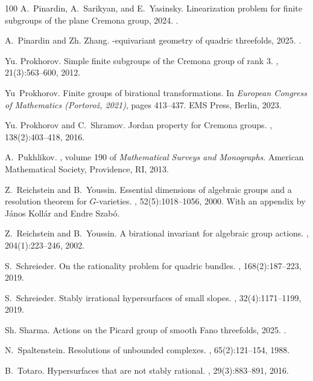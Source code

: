 \documentclass[12pt,reqno]{amsart}
\theoremstyle{plain}
\theoremstyle{remark}
\theoremstyle{definition}
\numberwithin{equation}{section}
\begin{document}
\begin{thebibliography}{100}
A.~Pinardin, A.~Sarikyan, and E.~Yasinsky.
\newblock Linearization problem for finite subgroups of the plane {C}remona
  group, 2024.
.

A.~Pinardin and Zh. Zhang.
-equivariant geometry of quadric threefolds, 2025.
.

Yu. Prokhorov.
\newblock Simple finite subgroups of the {C}remona group of rank 3.
, 21(3):563--600, 2012.

Yu~Prokhorov.
\newblock Finite groups of birational transformations.
\newblock In {\em European {C}ongress of {M}athematics ({P}ortoro{\v z},
  2021)}, pages 413--437. EMS Press, Berlin, 2023.

Yu. Prokhorov and C.~Shramov.
\newblock Jordan property for {C}remona groups.
, 138(2):403--418, 2016.

A.~Pukhlikov.
, volume 190 of {\em Mathematical
  Surveys and Monographs}.
\newblock American Mathematical Society, Providence, RI, 2013.

Z.~Reichstein and B.~Youssin.
\newblock Essential dimensions of algebraic groups and a resolution theorem for
  {$G$}-varieties.
, 52(5):1018--1056, 2000.
\newblock With an appendix by J\'{a}nos Koll\'{a}r and Endre Szab\'{o}.

Z.~Reichstein and B.~Youssin.
\newblock A birational invariant for algebraic group actions.
, 204(1):223--246, 2002.

S.~Schreieder.
\newblock On the rationality problem for quadric bundles.
, 168(2):187--223, 2019.

S.~Schreieder.
\newblock Stably irrational hypersurfaces of small slopes.
, 32(4):1171--1199, 2019.

Sh. Sharma.
\newblock Actions on the {P}icard group of smooth {F}ano threefolds, 2025.
.

N.~Spaltenstein.
\newblock Resolutions of unbounded complexes.
, 65(2):121--154, 1988.

B.~Totaro.
\newblock Hypersurfaces that are not stably rational.
, 29(3):883--891, 2016.


\end{thebibliography}
\end{document}
